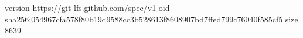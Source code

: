 version https://git-lfs.github.com/spec/v1
oid sha256:054967cfa578f80b19d9588cc3b528613f8608907bd7ffed799c76040f585cf5
size 8639
